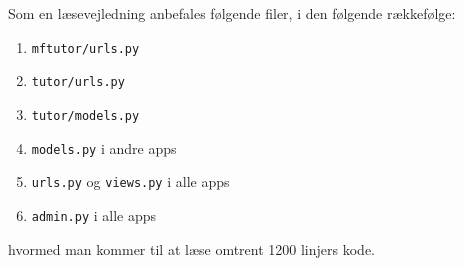 \documentclass[article,oneside,a4paper]{memoir}
\begin{document}
Som en læsevejledning anbefales følgende filer, i den følgende rækkefølge:

\begin{enumerate}\itemsep1pt \parskip0pt 
  \item \texttt{mftutor/urls.py}
  \item \texttt{tutor/urls.py}
  \item \texttt{tutor/models.py}
  \item \texttt{models.py} i andre apps
  \item \texttt{urls.py} og \texttt{views.py} i alle apps
  \item \texttt{admin.py} i alle apps
\end{enumerate}
hvormed man kommer til at læse omtrent 1200 linjers kode.
\end{document}
